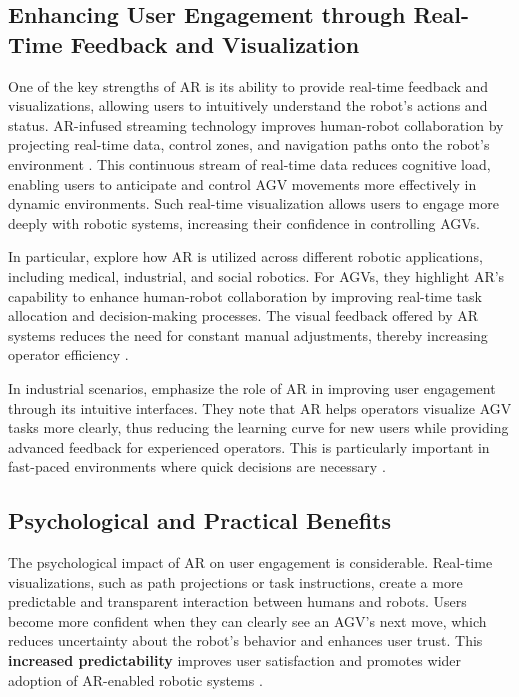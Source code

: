\subsection{Enhancing User Engagement through Real-Time Feedback and Visualization}

One of the key strengths of AR is its ability to provide real-time feedback and visualizations, allowing users to intuitively understand the robot’s actions and status. AR-infused streaming technology improves human-robot collaboration by projecting real-time data, control zones, and navigation paths onto the robot's environment \cite{Fu2023}. This continuous stream of real-time data reduces cognitive load, enabling users to anticipate and control AGV movements more effectively in dynamic environments. Such real-time visualization allows users to engage more deeply with robotic systems, increasing their confidence in controlling AGVs.

In particular, \cite{Fu2023} explore how AR is utilized across different robotic applications, including medical, industrial, and social robotics. For AGVs, they highlight AR's capability to enhance human-robot collaboration by improving real-time task allocation and decision-making processes. The visual feedback offered by AR systems reduces the need for constant manual adjustments, thereby increasing operator efficiency \cite{Fu2023}.

In industrial scenarios, \cite{Makhataeva2020} emphasize the role of AR in improving user engagement through its intuitive interfaces. They note that AR helps operators visualize AGV tasks more clearly, thus reducing the learning curve for new users while providing advanced feedback for experienced operators. This is particularly important in fast-paced environments where quick decisions are necessary \cite{Makhataeva2020}.

\subsection{Psychological and Practical Benefits}

The psychological impact of AR on user engagement is considerable. Real-time visualizations, such as path projections or task instructions, create a more predictable and transparent interaction between humans and robots. Users become more confident when they can clearly see an AGV's next move, which reduces uncertainty about the robot's behavior and enhances user trust. This \textbf{increased predictability} improves user satisfaction and promotes wider adoption of AR-enabled robotic systems \cite{Coovert2014}.

